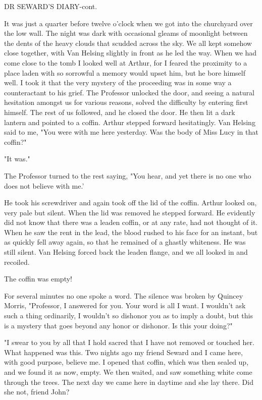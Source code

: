 DR SEWARD'S DIARY-cont. 

It was just a quarter before twelve o'clock when we got into the churchyard over the low wall. The night was dark with occasional gleams of moonlight between the dents of the heavy clouds that scudded across the sky. We all kept somehow close together, with Van Helsing slightly in front as he led the way. When we had come close to the tomb I looked well at Arthur, for I feared the proximity to a place laden with so sorrowful a memory would upset him, but he bore himself well. I took it that the very mystery of the proceeding was in some way a counteractant to his grief. The Professor unlocked the door, and seeing a natural hesitation amongst us for various reasons, solved the difficulty by entering first himself. The rest of us followed, and he closed the door. He then lit a dark lantern and pointed to a coffin. Arthur stepped forward hesitatingly. Van Helsing said to me, "You were with me here yesterday. Was the body of Miss Lucy in that coffin?" 

"It was." 

The Professor turned to the rest saying, "You hear, and yet there is no one who does not believe with me.' 

He took his screwdriver and again took off the lid of the coffin. Arthur looked on, very pale but silent. When the lid was removed he stepped forward. He evidently did not know that there was a leaden coffin, or at any rate, had not thought of it. When he saw the rent in the lead, the blood rushed to his face for an instant, but as quickly fell away again, so that he remained of a ghastly whiteness. He was still silent. Van Helsing forced back the leaden flange, and we all looked in and recoiled. 

The coffin was empty! 

For several minutes no one spoke a word. The silence was broken by Quincey Morris, "Professor, I answered for you. Your word is all I want. I wouldn't ask such a thing ordinarily, I wouldn't so dishonor you as to imply a doubt, but this is a mystery that goes beyond any honor or dishonor. Is this your doing?" 

"I swear to you by all that I hold sacred that I have not removed or touched her. What happened was this. Two nights ago my friend Seward and I came here, with good purpose, believe me. I opened that coffin, which was then sealed up, and we found it as now, empty. We then waited, and saw something white come through the trees. The next day we came here in daytime and she lay there. Did she not, friend John? 

